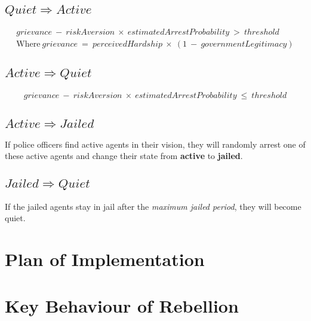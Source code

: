 \documentclass[UTF8,11pt]{article}
\begin{document}
        \subsection{$Quiet \Rightarrow Active$}
        \begin{equation}
            \begin{split}
                grievance\:-\:riskAversion\:\times\:estimatedArrestProbability\:>\:threshold \\
                \text{Where}\ grievance\:=\:perceivedHardship\:\times\:(1\:-\:governmentLegitimacy)
            \end{split}
        \end{equation}
        \subsection{$Active \Rightarrow Quiet$}
        \begin{equation}
            \begin{split}
                grievance\:-\:riskAversion\:\times\:estimatedArrestProbability\:\leq\:threshold
            \end{split}
        \end{equation}
        \subsection{$Active \Rightarrow Jailed$}
            If police officers find active agents in their vision, they will
            randomly arrest one of these active agents and change their state 
            from \textbf{active} to \textbf{jailed}.
        \subsection{$Jailed \Rightarrow Quiet$}
            If the jailed agents stay in jail after the \textit{maximum jailed 
            period}, they will become quiet.

    \section{Plan of Implementation}

    \section{Key Behaviour of Rebellion}
\end{document}
